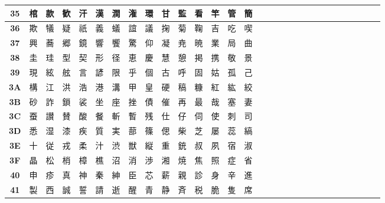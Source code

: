\begin{table}[H]
\begin{tabular}{|Sc|Sc|Sc|Sc|Sc|Sc|Sc|Sc|Sc|Sc|Sc|Sc|Sc|Sc|Sc|}
\textbf{35} & 棺 & 款 & 歓 & 汗 & 漢 & 澗 & 潅 & 環 & 甘 & 監 & 看 & 竿 & 管 & 簡 \\ \hline
\textbf{36} & 欺 & 犠 & 疑 & 祇 & 義 & 蟻 & 誼 & 議 & 掬 & 菊 & 鞠 & 吉 & 吃 & 喫 \\ \hline
\textbf{37} & 興 & 蕎 & 郷 & 鏡 & 響 & 饗 & 驚 & 仰 & 凝 & 尭 & 暁 & 業 & 局 & 曲 \\ \hline
\textbf{38} & 圭 & 珪 & 型 & 契 & 形 & 径 & 恵 & 慶 & 慧 & 憩 & 掲 & 携 & 敬 & 景 \\ \hline
\textbf{39} & 現 & 絃 & 舷 & 言 & 諺 & 限 & 乎 & 個 & 古 & 呼 & 固 & 姑 & 孤 & 己 \\ \hline
\textbf{3A} & 構 & 江 & 洪 & 浩 & 港 & 溝 & 甲 & 皇 & 硬 & 稿 & 糠 & 紅 & 紘 & 絞 \\ \hline
\textbf{3B} & 砂 & 詐 & 鎖 & 裟 & 坐 & 座 & 挫 & 債 & 催 & 再 & 最 & 哉 & 塞 & 妻 \\ \hline
\textbf{3C} & 蚕 & 讃 & 賛 & 酸 & 餐 & 斬 & 暫 & 残 & 仕 & 仔 & 伺 & 使 & 刺 & 司 \\ \hline
\textbf{3D} & 悉 & 湿 & 漆 & 疾 & 質 & 実 & 蔀 & 篠 & 偲 & 柴 & 芝 & 屡 & 蕊 & 縞 \\ \hline
\textbf{3E} & 十 & 従 & 戎 & 柔 & 汁 & 渋 & 獣 & 縦 & 重 & 銃 & 叔 & 夙 & 宿 & 淑 \\ \hline
\textbf{3F} & 晶 & 松 & 梢 & 樟 & 樵 & 沼 & 消 & 渉 & 湘 & 焼 & 焦 & 照 & 症 & 省 \\ \hline
\textbf{40} & 申 & 疹 & 真 & 神 & 秦 & 紳 & 臣 & 芯 & 薪 & 親 & 診 & 身 & 辛 & 進 \\ \hline
\textbf{41} & 製 & 西 & 誠 & 誓 & 請 & 逝 & 醒 & 青 & 静 & 斉 & 税 & 脆 & 隻 & 席 \\ \hline
\end{tabular}
\end{table}

